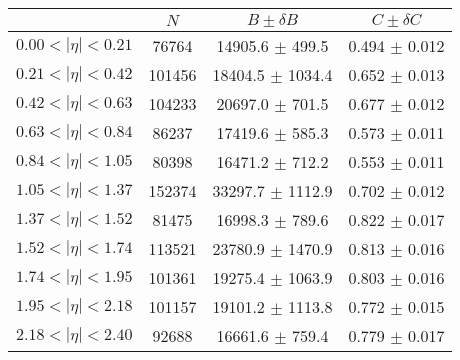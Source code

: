 \begin{tabular}{lccc}
\hline
    &   $N$   & $B \pm \delta B$  &  $C \pm \delta C$ \\
\hline
$0.00 < |\eta| <0.21$          & 76764      & 14905.6    $\pm$ 499.5 & 0.494      $\pm$ 0.012 \\
$0.21 < |\eta| <0.42$          & 101456     & 18404.5    $\pm$ 1034.4 & 0.652      $\pm$ 0.013 \\
$0.42 < |\eta| <0.63$          & 104233     & 20697.0    $\pm$ 701.5 & 0.677      $\pm$ 0.012 \\
$0.63 < |\eta| <0.84$          & 86237      & 17419.6    $\pm$ 585.3 & 0.573      $\pm$ 0.011 \\
$0.84 < |\eta| <1.05$          & 80398      & 16471.2    $\pm$ 712.2 & 0.553      $\pm$ 0.011 \\
$1.05 < |\eta| <1.37$          & 152374     & 33297.7    $\pm$ 1112.9 & 0.702      $\pm$ 0.012 \\
$1.37 < |\eta| <1.52$          & 81475      & 16998.3    $\pm$ 789.6 & 0.822      $\pm$ 0.017 \\
$1.52 < |\eta| <1.74$          & 113521     & 23780.9    $\pm$ 1470.9 & 0.813      $\pm$ 0.016 \\
$1.74 < |\eta| <1.95$          & 101361     & 19275.4    $\pm$ 1063.9 & 0.803      $\pm$ 0.016 \\
$1.95 < |\eta| <2.18$          & 101157     & 19101.2    $\pm$ 1113.8 & 0.772      $\pm$ 0.015 \\
$2.18 < |\eta| <2.40$          & 92688      & 16661.6    $\pm$ 759.4 & 0.779      $\pm$ 0.017 \\
\hline
\end{tabular}
